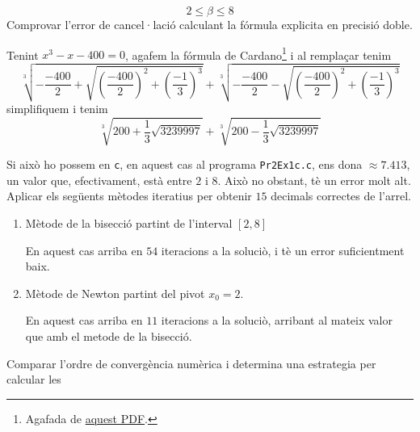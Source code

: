\documentclass[a4paper, 12pt]{article}
\begin{document}
\begin{exercici}
\begin{enumerate}[label=\alph*)]
\begin{displaymath}
                2 \leq \beta \leq 8
            \end{displaymath}
            Comprovar l'error de cancel·lació calculant la fórmula explicita en precisió doble.\\
            \begin{solucio}
                Tenint $x^3 -x -400 = 0$, agafem la fórmula de Cardano\footnote[1]{Agafada de \href{https://www.uv.es/~ivorra/Libros/Ecuaciones.pdf}{aquest PDF}.}
                i al remplaçar tenim
                \begin{displaymath}
                    \sqrt[3]{-\frac{-400}{2}+\sqrt{\left(\frac{-400}{2}\right)^2+\left(\frac{-1}{3}\right)^3}}+\sqrt[3]{-\frac{-400}{2}-\sqrt{\left(\frac{-400}{2}\right)^2+\left(\frac{-1}{3}\right)^3}}
                \end{displaymath}
                simplifiquem i tenim
                \begin{displaymath}
                    \sqrt[3]{200+\frac{1}{3}\sqrt{3239997}}+\sqrt[3]{200-\frac{1}{3}\sqrt{3239997}}
                \end{displaymath}
            \end{solucio}
            Si això ho possem en \verb|c|, en aquest cas al programa \verb|Pr2Ex1c.c|, ens dona $\approx 7.413$,
            un valor que, efectivament, està entre $2$ i $8$. Això no obstant, tè un error molt alt.
            Aplicar els següents mètodes iteratius per obtenir $15$ decimals correctes de l'arrel.
            \begin{enumerate}
                \item Mètode de la bisecció partint de l'interval $\left[2,8\right]$\\
                \begin{solucio}
                    En aquest cas arriba en $54$ iteracions a la soluciò, i tè un error suficientment
                    baix.
                \end{solucio}
                \item Mètode de Newton partint del pivot $x_0 = 2$.\\
                \begin{solucio}
                    En aquest cas arriba en $11$ iteracions a la soluciò, arribant al mateix valor
                    que amb el metode de la bisecció.
                \end{solucio}
            \end{enumerate}
            Comparar l'ordre de convergència numèrica i determina una estrategia per calcular les

\end{enumerate}
\end{exercici}
\end{document}
